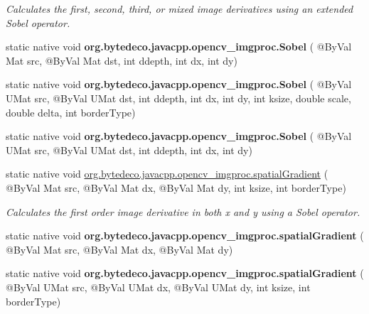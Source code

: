 \begin{DoxyCompactItemize}
\begin{DoxyCompactList}\small\item\em Calculates the first, second, third, or mixed image derivatives using an extended Sobel operator. \end{DoxyCompactList}\item 
\mbox{\label{group__imgproc__filter_gabccce6b56a1dddcbe6e5477e72bfdace}} 
static native void {\bfseries org.\+bytedeco.\+javacpp.\+opencv\+\_\+imgproc.\+Sobel} ( @By\+Val Mat src, @By\+Val Mat dst, int ddepth, int dx, int dy)
\item 
\mbox{\label{group__imgproc__filter_gab3caf932611ece89e8bed4dcdf598fd4}} 
static native void {\bfseries org.\+bytedeco.\+javacpp.\+opencv\+\_\+imgproc.\+Sobel} ( @By\+Val U\+Mat src, @By\+Val U\+Mat dst, int ddepth, int dx, int dy, int ksize, double scale, double delta, int border\+Type)
\item 
\mbox{\label{group__imgproc__filter_gafa284cff1dffaff09659785f42a8a389}} 
static native void {\bfseries org.\+bytedeco.\+javacpp.\+opencv\+\_\+imgproc.\+Sobel} ( @By\+Val U\+Mat src, @By\+Val U\+Mat dst, int ddepth, int dx, int dy)
\item 
static native void \hyperlink{group__imgproc__filter_ga9263e9262b1d9a29e4dc3180d4ee2683}{org.\+bytedeco.\+javacpp.\+opencv\+\_\+imgproc.\+spatial\+Gradient} ( @By\+Val Mat src, @By\+Val Mat dx, @By\+Val Mat dy, int ksize, int border\+Type)
\begin{DoxyCompactList}\small\item\em Calculates the first order image derivative in both x and y using a Sobel operator. \end{DoxyCompactList}\item 
\mbox{\label{group__imgproc__filter_gaf7fe45c6c7a7b791fe6683227e80f220}} 
static native void {\bfseries org.\+bytedeco.\+javacpp.\+opencv\+\_\+imgproc.\+spatial\+Gradient} ( @By\+Val Mat src, @By\+Val Mat dx, @By\+Val Mat dy)
\item 
\mbox{\label{group__imgproc__filter_gae2ccdf9f61018c4bf9c3dbf48f603257}} 
static native void {\bfseries org.\+bytedeco.\+javacpp.\+opencv\+\_\+imgproc.\+spatial\+Gradient} ( @By\+Val U\+Mat src, @By\+Val U\+Mat dx, @By\+Val U\+Mat dy, int ksize, int border\+Type)

\end{DoxyCompactItemize}
